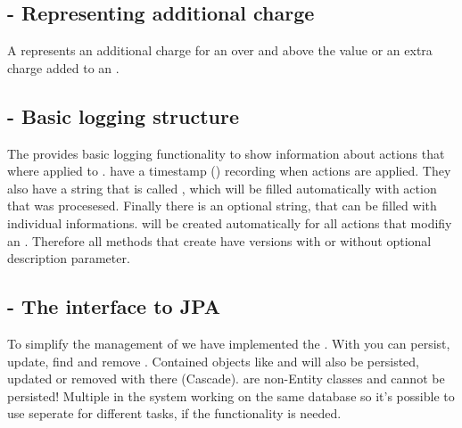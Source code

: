 \subsection{ - Representing additional charge}
A  represents an additional charge for an  over and above the  value or an extra charge added to an .

\subsection{ - Basic logging structure}
The  provides basic logging functionality to show information about actions that where applied to .  have a timestamp () recording when actions are applied. They also have a string that is called , which will be filled automatically with action that was procesesed. Finally there is an optional  string, that can be filled with individual informations.
 will be created automatically for all actions that modifiy an . Therefore all methods that create  have versions with or without optional description parameter.

\subsection{ - The interface to JPA}
To simplify the management of  we have implemented the . With  you can persist, update, find and remove . Contained objects like  and  will also be persisted, updated or removed with there  (Cascade).
 are non-Entity classes and cannot be persisted! Multiple  in the system working on the same database so it's possible to use seperate  for different tasks, if the functionality is needed. 

